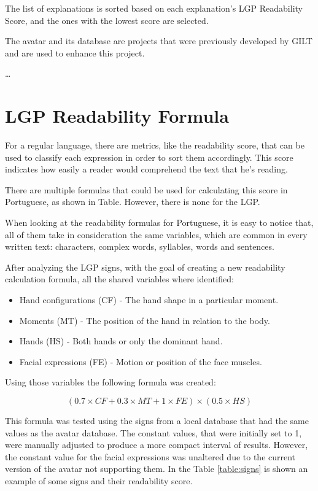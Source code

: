 The list of explanations is sorted based on each explanation's LGP Readability Score, and the ones with the lowest score are selected.

The avatar and its database are projects that were previously developed by GILT and are used to enhance this project.

\dots %

\section{LGP Readability Formula}

For a regular language, there are metrics, like the readability score, that can be used to classify each expression in order to sort them accordingly.
This score indicates how easily a reader would comprehend the text that he's reading.

There are multiple formulas that could be used for calculating this score in Portuguese, as shown in Table. %
However, there is none for the LGP.

When looking at the readability formulas for Portuguese, it is easy to notice that, all of them take in consideration the same variables, which are common in every written text: characters, complex words, syllables, words and sentences.

After analyzing the LGP signs, with the goal of creating a new readability calculation formula, all the shared variables where identified:

\begin{itemize}
    \item Hand configurations (CF) - The hand shape in a particular moment.
    \item Moments (MT) - The position of the hand in relation to the body.
    \item Hands (HS) - Both hands or only the dominant hand.
    \item Facial expressions (FE) - Motion or position of the face muscles.
\end{itemize}

Using those variables the following formula was created:

\begin{equation}
(0.7 \times CF + 0.3 \times MT + 1 \times FE) \times (0.5 \times HS)
\label{wordScore}
\end{equation}

This formula was tested using the signs from a local database that had the same values as the avatar database.
The constant values, that were initially set to 1, were manually adjusted to produce a more compact interval of results.
However, the constant value for the facial expressions was unaltered due to the current version of the avatar not supporting them.
In the Table \ref{table:signs} is shown an example of some signs and their readability score.

